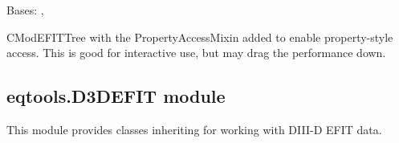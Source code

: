\documentclass[letterpaper,10pt,english]{sphinxmanual}
\begin{document}

\begin{fulllineitems}
\label{\detokenize{eqtools:eqtools.CModEFIT.CModEFITTreeProp}}
Bases: {\hyperref[\detokenize{eqtools:eqtools.CModEFIT.CModEFITTree}]{}}, {\hyperref[\detokenize{eqtools:eqtools.core.PropertyAccessMixin}]{}}

CModEFITTree with the PropertyAccessMixin added to enable property-style
access. This is good for interactive use, but may drag the performance down.

\end{fulllineitems}



\subsection{eqtools.D3DEFIT module}
\label{\detokenize{eqtools:module-eqtools.D3DEFIT}}\label{\detokenize{eqtools:eqtools-d3defit-module}}
This module provides classes inheriting {\hyperref[\detokenize{eqtools:eqtools.EFIT.EFITTree}]{}} for
working with DIII-D EFIT data.
\end{document}
